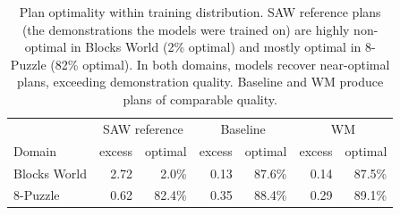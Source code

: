 \begin{table}[t]
\centering
\caption{Plan optimality within training distribution. SAW reference plans (the demonstrations the models were trained on) are highly non-optimal in Blocks World (2\% optimal) and mostly optimal in 8-Puzzle (82\% optimal). In both domains, models recover near-optimal plans, exceeding demonstration quality. Baseline and WM produce plans of comparable quality.}
\label{tab:optimality}
\begin{tabular}{lrr|rr|rr}
\toprule
& \multicolumn{2}{c}{SAW reference} & \multicolumn{2}{c}{Baseline} & \multicolumn{2}{c}{WM} \\
Domain & excess & optimal & excess & optimal & excess & optimal \\
\midrule
Blocks World & 2.72 & 2.0\% & 0.13 & 87.6\% & 0.14 & 87.5\% \\
8-Puzzle & 0.62 & 82.4\% & 0.35 & 88.4\% & 0.29 & 89.1\% \\
\bottomrule
\end{tabular}
\end{table}
